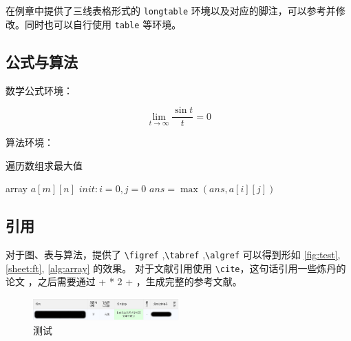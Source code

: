 \documentclass[lang=cn,12pt]{frbpaper}
\begin{document}
在例章中提供了三线表格形式的 \lstinline{longtable} 环境以及对应的脚注，可以参考并修改。同时也可以自行使用 \lstinline{table} 等环境。

\subsection{公式与算法} 

数学公式环境：

\[\lim_{t \rightarrow \infty} \dfrac{\sin t}{t} = 0 \]

算法环境：

\begin{algorithm}
    \caption{遍历数组求最大值}
    \label{alg:array}
    \begin{algorithmic}
        \REQUIRE array \(a[m][n]\)
        \STATE \(init: i = 0, j = 0\)
        \REPEAT 
        \REPEAT
        \STATE \(ans = \max (ans, a[i][j])\)
    \end{algorithmic}
\end{algorithm}

\subsection{引用}

对于图、表与算法，提供了 \lstinline{\figref} ,\lstinline{\tabref} ,\lstinline{\algref} 可以得到形如 \ref{fig:test}, \ref{sheet:ft}, \ref{alg:array} 的效果。
对于文献引用使用 \lstinline{\cite}，这句话引用一些炼丹的论文 \cite{ghostnet,parashar2017scnn,park2017scale,abok}，之后需要通过  +  * 2 + ，生成完整的参考文献。


\begin{figure}[htb]
    \centering
    \includegraphics[width=0.5\textwidth]{figures/pass.png}
    \caption{测试}\label{fig:test}
    \label{fig:01}
\end{figure}
\end{document}

